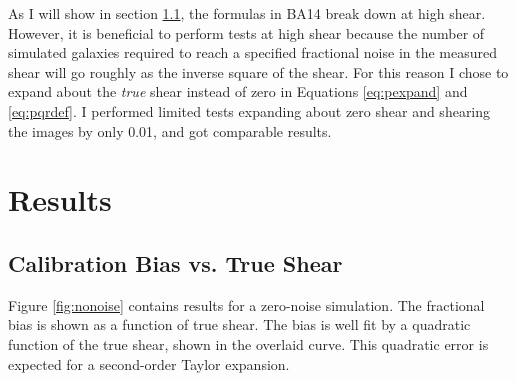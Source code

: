 \documentclass[12pt,preprint]{aastex}
\begin{document}
As I will show in section \ref{sec:truebias}, the formulas in BA14 break down
at high shear.  However, it is beneficial to perform tests at high shear
because the number of simulated galaxies required to reach a specified
fractional noise in the measured shear will go roughly as the inverse square of
the shear.  For this reason I chose to expand about the {\it true} shear
instead of zero in Equations \ref{eq:pexpand} and \ref{eq:pqrdef}.  I performed
limited tests expanding about zero shear and shearing the images by only 0.01,
and got comparable results. 

\section{Results} \label{sec:results}

\subsection{Calibration Bias vs. True Shear} \label{sec:truebias}

Figure \ref{fig:nonoise} contains results for a zero-noise simulation.  The
fractional bias is shown as a function of true shear.  The bias is well fit by
a quadratic function of the true shear, shown in the overlaid curve. This
quadratic error is expected for a second-order Taylor expansion.
\end{document}
